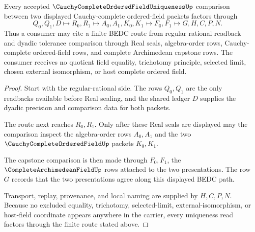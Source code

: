 \begin{theorem}
\label{thm:cauchy-complete-ordered-field-uniqueness-route}
Every accepted $\CauchyCompleteOrderedFieldUniquenessUp$ comparison between two displayed Cauchy-complete ordered-field packets factors through
$$
Q_0,Q_1,D \longmapsto R_0,R_1 \longmapsto A_0,A_1,K_0,K_1 \longmapsto F_0,F_1 \longmapsto G,H,C,P,N .
$$
Thus a consumer may cite a finite BEDC route from regular rational readback and dyadic tolerance comparison through Real seals, algebra-order rows, Cauchy-complete ordered-field rows, and complete Archimedean capstone rows. The consumer receives no quotient field equality, trichotomy principle, selected limit, chosen external isomorphism, or host complete ordered field.
\end{theorem}
\begin{proof}
Start with the regular-rational side. The rows $Q_0,Q_1$ are the only readbacks available before Real sealing, and the shared ledger $D$ supplies the dyadic precision and comparison data for both packets.

The route next reaches $R_0,R_1$. Only after these Real seals are displayed may the comparison inspect the algebra-order rows $A_0,A_1$ and the two $\CauchyCompleteOrderedFieldUp$ packets $K_0,K_1$.

The capstone comparison is then made through $F_0,F_1$, the $\CompleteArchimedeanFieldUp$ rows attached to the two presentations. The row $G$ records that the two presentations agree along this displayed BEDC path.

Transport, replay, provenance, and local naming are supplied by $H,C,P,N$. Because no excluded equality, trichotomy, selected-limit, external-isomorphism, or host-field coordinate appears anywhere in the carrier, every uniqueness read factors through the finite route stated above.
\end{proof}

